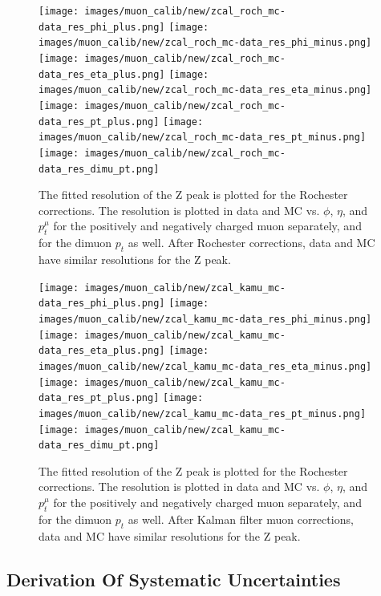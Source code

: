 \begin{figure}[!h]
  \centering
  \texttt{[image: images/muon\_calib/new/zcal\_roch\_mc-data\_res\_phi\_plus.png]}
  \texttt{[image: images/muon\_calib/new/zcal\_roch\_mc-data\_res\_phi\_minus.png]}
  \texttt{[image: images/muon\_calib/new/zcal\_roch\_mc-data\_res\_eta\_plus.png]}
  \texttt{[image: images/muon\_calib/new/zcal\_roch\_mc-data\_res\_eta\_minus.png]}
  \texttt{[image: images/muon\_calib/new/zcal\_roch\_mc-data\_res\_pt\_plus.png]}
  \texttt{[image: images/muon\_calib/new/zcal\_roch\_mc-data\_res\_pt\_minus.png]}
  \texttt{[image: images/muon\_calib/new/zcal\_roch\_mc-data\_res\_dimu\_pt.png]}
  \caption[The Z mass peak resolution in data and MC after Rochester corrections.]
   {The fitted resolution of the Z peak is plotted for the Rochester corrections. The resolution is plotted in data and MC vs. $\phi$, $\eta$, and $p_t^\mu$ for the positively and negatively charged muon separately, and for the dimuon $p_t$ as well. After Rochester corrections, data and MC have similar resolutions for the Z peak.}
  \label{fig:data_mc_roch_res_after}
\end{figure}
\begin{figure}[!h]
  \centering
  \texttt{[image: images/muon\_calib/new/zcal\_kamu\_mc-data\_res\_phi\_plus.png]}
  \texttt{[image: images/muon\_calib/new/zcal\_kamu\_mc-data\_res\_phi\_minus.png]}
  \texttt{[image: images/muon\_calib/new/zcal\_kamu\_mc-data\_res\_eta\_plus.png]}
  \texttt{[image: images/muon\_calib/new/zcal\_kamu\_mc-data\_res\_eta\_minus.png]}
  \texttt{[image: images/muon\_calib/new/zcal\_kamu\_mc-data\_res\_pt\_plus.png]}
  \texttt{[image: images/muon\_calib/new/zcal\_kamu\_mc-data\_res\_pt\_minus.png]}
  \texttt{[image: images/muon\_calib/new/zcal\_kamu\_mc-data\_res\_dimu\_pt.png]}
  \caption[The Z peak mass peak resolution in data and MC after Kalman Filter corrections.]
   {The fitted resolution of the Z peak is plotted for the Rochester corrections. The resolution is plotted in data and MC vs. $\phi$, $\eta$, and $p_t^\mu$ for the positively and negatively charged muon separately, and for the dimuon $p_t$ as well. After Kalman filter muon corrections, data and MC have similar resolutions for the Z peak.}
  \label{fig:data_mc_kamu_res_after}
\end{figure}

\FloatBarrier
\subsection{Derivation Of Systematic Uncertainties}

